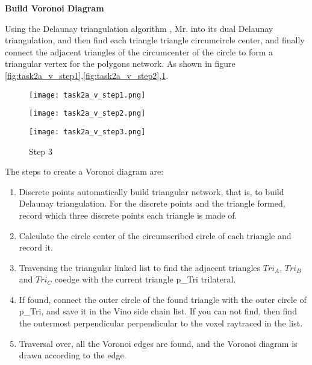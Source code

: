 \documentclass{mcmthesis}
\begin{document}
\textbf{Build Voronoi Diagram}

\par Using the Delaunay triangulation algorithm , Mr. into its dual Delaunay triangulation, and then find each triangle triangle circumcircle center, and finally connect the adjacent triangles of the circumcenter of the circle to form a triangular vertex for the polygons network. As shown in figure \ref{fig:task2a_v_step1},\ref{fig:task2a_v_step2},\ref{fig:task2a_v_step3}.


\begin{figure}[htbp]  
\centering
\begin{minipage}[t]{0.2\textwidth}
\centering  
\texttt{[image: task2a\_v\_step1.png]} \\
\caption{Step 1} \label{fig:task2a_v_step1}
\end{minipage}
\hspace{1ex}
\begin{minipage}[t]{0.2\textwidth}
\centering  
\texttt{[image: task2a\_v\_step2.png]} \\
\caption{Step 2} \label{fig:task2a_v_step2}
\end{minipage}
\hspace{1ex}
\begin{minipage}[t]{0.2\textwidth}  
\centering  
\texttt{[image: task2a\_v\_step3.png]}\\
\caption{Step 3}  \label{fig:task2a_v_step3}
\end{minipage}  
\end{figure} 

\par The steps to create a Voronoi diagram are: 

\begin{enumerate}
	\item Discrete points automatically build triangular network, that is, to build Delaunay triangulation. For the discrete points and the triangle formed, record which three discrete points each triangle is made of.
	\item  Calculate the circle center of the circumscribed circle of each triangle and record it.
	\item Traversing the triangular linked list to find the adjacent triangles $Tri_A$, $Tri_B$ and $Tri_C$ coedge with the current triangle p\_Tri trilateral.
	\item If found, connect the outer circle of the found triangle with the outer circle of p\_Tri, and save it in the Vino side chain list. If you can not find, then find the outermost perpendicular perpendicular to the voxel raytraced in the list.
	\item Traversal over, all the Voronoi edges are found, and the Voronoi diagram is drawn according to the edge.
\end{enumerate}
\end{document}
